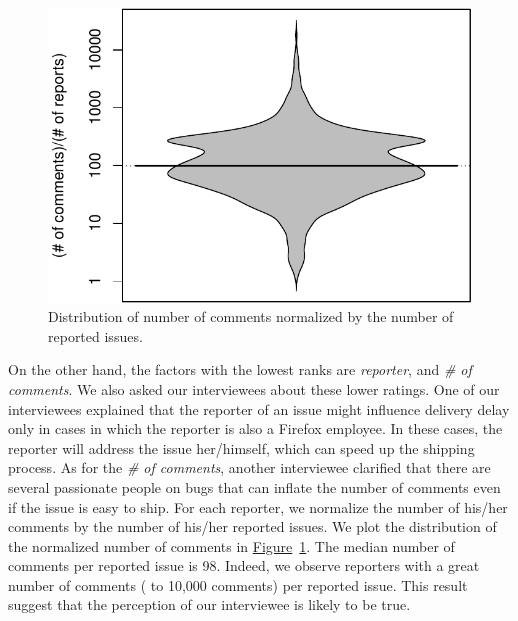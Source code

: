 \begin{sloppypar}
\begin{figure}
	\centering
	\includegraphics[width=.8\textwidth,keepaspectratio]
	{chapters/chapter5/figures/comments_ratio.pdf}
	\caption{Distribution of number of comments normalized by the number of
	reported issues.}
	\label{fig:comments_ratio}
\end{figure}

On the other hand, the factors with the lowest ranks are {\em reporter}, and
{\em \# of comments}. We also asked our interviewees about these lower ratings.
One of our interviewees explained that the reporter of an issue might influence
delivery delay only in cases in which the reporter is also a Firefox employee.
In these cases, the reporter will address the issue her/himself, which can speed
up the shipping process. As for the {\em \# of comments}, another interviewee
clarified that there are several passionate people on bugs that can inflate the
number of comments even if the issue is easy to ship. For each reporter, we
normalize the number of his/her comments by the number of his/her reported
issues.  We plot the distribution of the normalized number of comments in
\hyperref[fig:comments_ratio]{Figure}~\ref{fig:comments_ratio}. The median
number of comments per reported issue is 98. Indeed, we observe reporters with a
great number of comments ( to 10,000 comments) per reported issue.  This
result suggest that the perception of our interviewee is likely to be true.


\end{sloppypar}
